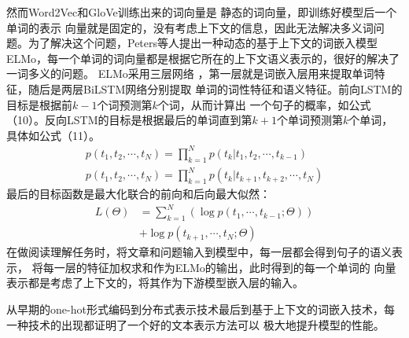 然而Word2Vec和GloVe训练出来的词向量是
静态的词向量，即训练好模型后一个单词的表示
向量就是固定的，没有考虑上下文的信息，因此无法解决多义词问题。为了解决这个问题，Peters等人提出一种动态的基于上下文的词嵌入模型ELMo，每一个单词的词向量都是根据它所在的上下文语义表示的，很好的解决了一词多义的问题。
ELMo采用三层网络
，第一层就是词嵌入层用来提取单词特征，随后是两层BiLSTM网络分别提取
单词的词性特征和语义特征。前向LSTM的目标是根据前$k-1$个词预测第$k$个词，从而计算出
一个句子的概率，如公式（10）。反向LSTM的目标是根据最后的单词直到第$k+1$个单词预测第$k$个单词，
具体如公式（11）。
\begin{gather}
p(t_1,t_2,\cdots,t_N)=\prod_{k=1}^{N}p(t_k|t_1,t_2,\cdots,t_{k-1})\\
p(t_1,t_2,\cdots,t_N)=\prod_{k=1}^{N}p(t_k|t_{k+1},t_{k+2},\cdots,t_{N})
\end{gather}
最后的目标函数是最大化联合的前向和后向最大似然：
\begin{equation}
\begin{split}
L(\Theta)&=\sum_{k=1}^{N}(\log p(t_1,\cdots,t_{k-1};\Theta)) \\
&+\log p(t_{k+1},\cdots,t_N;\Theta)
\end{split}
\end{equation}
在做阅读理解任务时，将文章和问题输入到模型中，每一层都会得到句子的语义表示，
将每一层的特征加权求和作为ELMo的输出，此时得到的每一个单词的
向量表示都是考虑了上下文的，将其作为下游模型嵌入层的输入。



从早期的one-hot形式编码到分布式表示技术最后到基于上下文的词嵌入技术，每一种技术的出现都证明了一个好的文本表示方法可以
极大地提升模型的性能。
